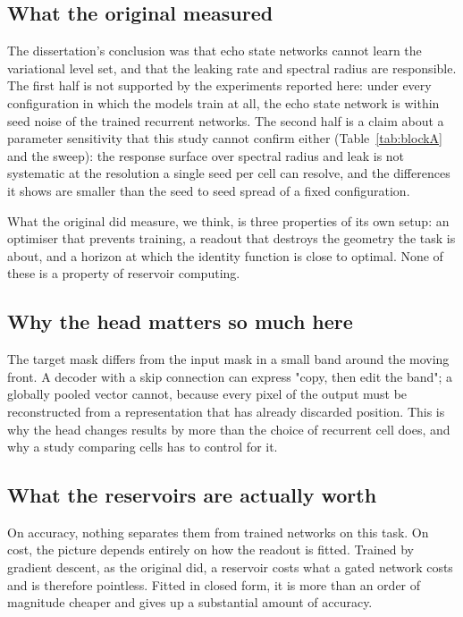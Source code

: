 \subsection{What the original measured}

The dissertation's conclusion was that echo state networks cannot learn the
variational level set, and that the leaking rate and spectral radius are
responsible. The first half is not supported by the experiments reported here:
under every configuration in which the models train at all, the echo state
network is within seed noise of the trained recurrent networks. The second half
is a claim about a parameter sensitivity that this study cannot confirm either
(Table~\ref{tab:blockA} and the sweep): the response surface over spectral
radius and leak is not systematic at the resolution a single seed per cell can
resolve, and the differences it shows are smaller than the seed to seed spread
of a fixed configuration.

What the original did measure, we think, is three properties of its own setup:
an optimiser that prevents training, a readout that destroys the geometry the
task is about, and a horizon at which the identity function is close to
optimal. None of these is a property of reservoir computing.

\subsection{Why the head matters so much here}

The target mask differs from the input mask in a small band around the moving
front. A decoder with a skip connection can express "copy, then edit the band";
a globally pooled vector cannot, because every pixel of the output must be
reconstructed from a representation that has already discarded position. This
is why the head changes results by more than the choice of recurrent cell does,
and why a study comparing cells has to control for it.

\subsection{What the reservoirs are actually worth}

On accuracy, nothing separates them from trained networks on this task. On
cost, the picture depends entirely on how the readout is fitted. Trained by
gradient descent, as the original did, a reservoir costs what a gated network
costs and is therefore pointless. Fitted in closed form, it is more than an
order of magnitude cheaper and gives up a substantial amount of accuracy.

